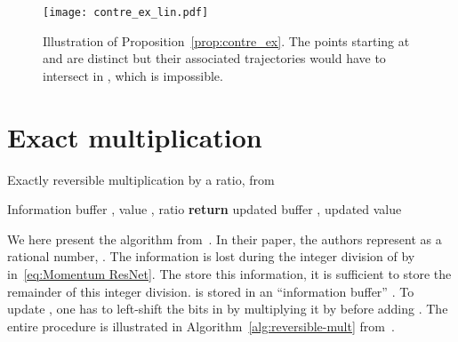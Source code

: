 \documentclass{article}
\begin{document}
\begin{figure}[ht]
\begin{center}
\centerline{\texttt{[image: contre\_ex\_lin.pdf]}}
\caption{Illustration of Proposition~\ref{prop:contre_ex}. The points starting at  and  are distinct but their associated trajectories would have to intersect in , which is impossible.}
\label{fig:contre_ex}
\end{center}
\end{figure}







\section{Exact multiplication}\label{app:memory_savings}

\begin{algorithm}
   \caption{Exactly reversible multiplication by a ratio, from \citet{10.5555/3045118.3045343}}
   \label{alg:reversible-mult}
\begin{algorithmic}[1]
    Information buffer , value , ratio   
   \STATE  
   \STATE   \label{step:f2}
   \STATE                 \label{step:f3}
   \STATE          \label{step:b1}
   \STATE          \label{step:b2}
   \STATE           \label{step:b3}
   \STATE \textbf{return} updated buffer , updated value 
\end{algorithmic}
\end{algorithm}


We here present the algorithm from~\citet{10.5555/3045118.3045343}. In their paper, the authors represent  as a rational number, . The information is lost during the integer division of  by  in~\eqref{eq:Momentum ResNet}. The store this information, it is sufficient to store the remainder  of this integer division.  is stored in an “information buffer” . To update , one has to left-shift the bits in  by multiplying it by  before adding . The entire procedure is illustrated in Algorithm~\ref{alg:reversible-mult} from~\citet{10.5555/3045118.3045343}.
 
\end{document}
